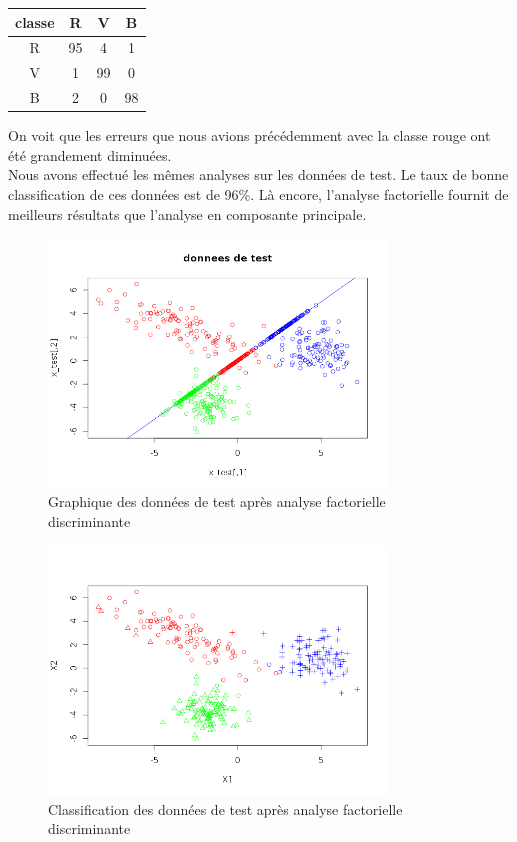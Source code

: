 \documentclass[a4paper,11pt]{article}
\begin{document}
  \begin{center}
  \begin{tabular}{|c|c|c|c|}
   \hline
   classe & R & V & B\\
   \hline
   R & 95 & 4 & 1 \\
   \hline
   V & 1 & 99 & 0 \\
   \hline
   B & 2 & 0 & 98 \\
   \hline
  \end{tabular}
  \end{center}
  
  On voit que les erreurs que nous avions précédemment avec la classe rouge ont été grandement
  diminuées.\\
  
  Nous avons effectué les mêmes analyses sur les données de test. Le taux de bonne classification de ces 
  données est de 96\%. Là encore, l'analyse factorielle fournit de meilleurs résultats que l'analyse en composante
  principale.\\
  
  \begin{figure}[H]
    \center
   \includegraphics[width=9cm]{test_fact.png}
    \caption{Graphique des données de test après analyse factorielle discriminante}
  \end{figure}
  
   \begin{figure}[H]
    \center
   \includegraphics[width=9cm]{test_fact_class.png}
    \caption{Classification des données de test après analyse factorielle discriminante}
  \end{figure}
  
\end{document}
